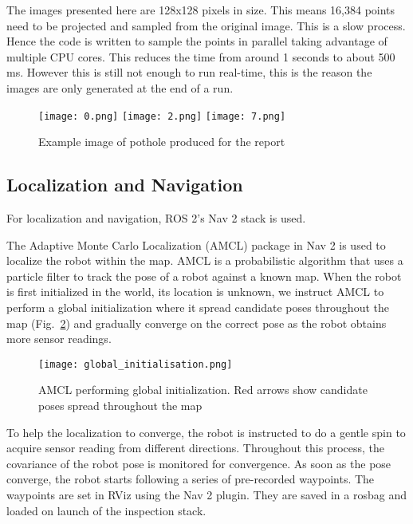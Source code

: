 \documentclass[conference]{IEEEtran}
\begin{document}
The images presented here are 128x128 pixels in size. This means 16,384 points need to be projected and sampled from the original image. This is a slow process. Hence the code is written to sample the points in parallel taking advantage of multiple CPU cores. This reduces the time from around 1 seconds to about 500 ms. However this is still not enough to run real-time, this is the reason the images are only generated at the end of a run.


\begin{figure}
    \centering
    \texttt{[image: 0.png]}
    \texttt{[image: 2.png]}
    \texttt{[image: 7.png]}
    \caption{Example image of pothole produced for the report}
    \label{fig:pothole_image}
\end{figure}

\subsection{Localization and Navigation}

For localization and navigation, ROS 2's Nav 2 \cite{macenskiMarathonNavigationSystem2020} stack is used.

The Adaptive Monte Carlo Localization (AMCL) package in Nav 2 is used to localize the robot within the map. AMCL is a probabilistic algorithm that uses a particle filter to track the pose of a robot against a known map. When the robot is first initialized in the world, its location is unknown, we instruct AMCL to perform a global initialization where it spread candidate poses throughout the map (Fig.~\ref{fig:global_initialisation}) and gradually converge on the correct pose as the robot obtains more sensor readings.

\begin{figure}
    \centering
    \texttt{[image: global\_initialisation.png]}
    \caption{AMCL performing global initialization. Red arrows show candidate poses spread throughout the map}
    \label{fig:global_initialisation}
\end{figure}

To help the localization to converge, the robot is instructed to do a gentle spin to acquire sensor reading from different directions. Throughout this process, the covariance of the robot pose is monitored for convergence. As soon as the pose converge, the robot starts following a series of pre-recorded waypoints. The waypoints are set in RViz using the Nav 2 plugin. They are saved in a rosbag and loaded on launch of the inspection stack.
\end{document}
